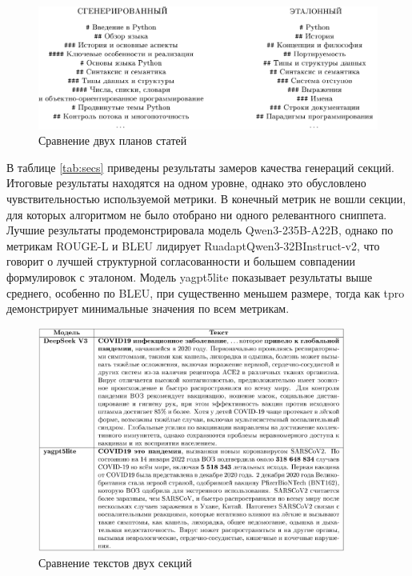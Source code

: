 \documentclass{article}
\begin{document}
\begin{figure}[ht!]
  \centering
  \includegraphics[width=\textwidth]{figures/outline.png}
  \caption{Сравнение двух планов статей}
  \label{fig:outline}
\end{figure}

В таблице \ref{tab:secs} приведены результаты замеров качества генераций секций. Итоговые результаты находятся на одном уровне, однако это обусловлено чувствительностью используемой метрики.
В конечный метрик не вошли секции, для которых алгоритмом не было отобрано ни одного релевантного сниппета. Лучшие результаты 
продемонстрировала модель Qwen3-\allowbreak 235B-\allowbreak A22B, однако по метрикам ROUGE-\allowbreak L и BLEU лидирует RuadaptQwen3-\allowbreak 32BInstruct-v2, что говорит о лучшей структурной согласованности и 
большем совпадении формулировок с эталоном.
Модель yagpt5lite показывает результаты выше среднего, особенно по BLEU, при существенно меньшем размере, тогда как tpro демонстрирует минимальные значения по всем метрикам.

\begin{figure}[ht!]
  \centering
  \includegraphics[width=0.9\textwidth]{figures/two_secs.png}
  \caption{Сравнение текстов двух секций}
  \label{fig:secs_com}
\end{figure}
\end{document}
